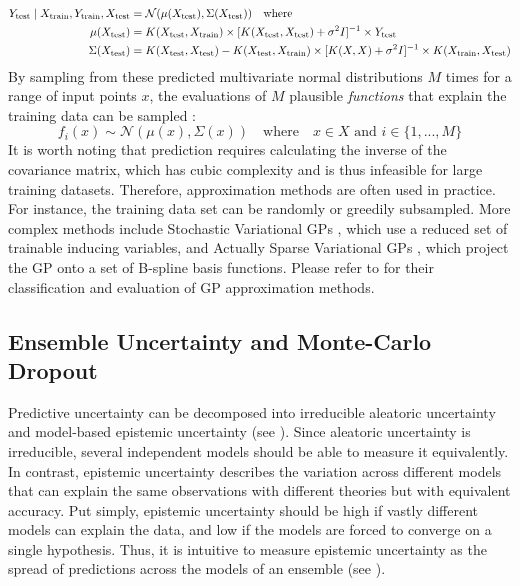 \begin{equation*}
    \begin{split}
        Y_{\text{test}} \mathrel{|} X_{\text{train}}, Y_{\text{train}}, X_{\text{test}} &= \mathcal{N}(\mu(X_{\text{test}}), \Sigma(X_{\text{test}})) \quad \text{where} \\
        \mu(X_{\text{test}}) &= K(X_{\text{test}}, X_{\text{train}}) \times [K(X_{\text{test}}, X_{\text{test}}) + \sigma^2 I]^{-1} \times Y_{\text{test}} \\
        \Sigma(X_{\text{test}}) &= K(X_{\text{test}}, X_{\text{test}}) - K(X_{\text{test}}, X_{\text{train}}) \times [K(X, X) + \sigma^2 I]^{-1} \times K(X_{\text{train}}, X_{\text{test}})
    \end{split}
\end{equation*}
\noindent By sampling from these predicted multivariate normal distributions $M$ times for a range of input points $x$, the evaluations of $M$ plausible \textit{functions} that explain the training data can be sampled \cite{gp-ml-2005}:
\begin{equation*}
    f_i(x) \sim \mathcal{N}(\mu(x), \Sigma(x)) \quad \text{where} \quad x \in X \text{ and } i \in \{1, ..., M\}
\end{equation*}
\noindent It is worth noting that prediction requires calculating the inverse of the covariance matrix, which has cubic complexity and is thus infeasible for large training datasets. Therefore, approximation methods are often used in practice. For instance, the training data set can be randomly or greedily \cite{gp-ml-2005} subsampled. More complex methods include Stochastic Variational GPs \cite{svgp-2013}, which use a reduced set of trainable inducing variables, and Actually Sparse Variational GPs \cite{asvgp-2023}, which project the GP onto a set of B-spline basis functions. Please refer to \textcite{big-data-gp-2022} for their classification and evaluation of GP approximation methods.

\subsection{Ensemble Uncertainty and Monte-Carlo Dropout} \label{txt:mc-dropout}

Predictive uncertainty can be decomposed into irreducible aleatoric uncertainty and model-based epistemic uncertainty (see ). Since aleatoric uncertainty is irreducible, several independent models should be able to measure it equivalently. In contrast, epistemic uncertainty describes the variation across different models that can explain the same observations with different theories but with equivalent accuracy. Put simply, epistemic uncertainty should be high if vastly different models can explain the data, and low if the models are forced to converge on a single hypothesis. Thus, it is intuitive to measure epistemic uncertainty as the spread of predictions across the models of an ensemble (see ).


